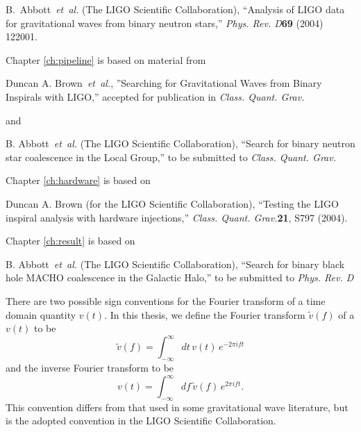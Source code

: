 \documentclass[12pt,notitlepage]{report}
\newcommand{\cqg}{{\it Class. Quant. Grav.}}
\newcommand{\prd}{{\it Phys. Rev. D}}
\begin{document}
\noindent B.~Abbott~{\it et~al.} (The LIGO Scientific Collaboration),
``Analysis of LIGO data for gravitational waves from binary neutron stars,''
\prd {\bf 69} (2004) 122001.
\vspace*{1.5cm}

\noindent Chapter \ref{ch:pipeline} is based on material from
\vspace*{0.5cm}

\noindent Duncan A. Brown~{\it et~al.}, ''Searching for Gravitational Waves
from Binary Inspirals with LIGO,'' accepted for publication in \cqg
\vspace*{0.5cm}

\noindent and
\vspace*{0.5cm}

\noindent B. Abbott~{\it et~al.} (The LIGO Scientific Collaboration), ``Search
for binary neutron star coalescence in the Local Group,'' to be submitted to
\cqg
\vspace*{1.5cm}

\noindent Chapter \ref{ch:hardware} is based on 
\vspace*{0.5cm}

\noindent Duncan A. Brown (for the LIGO Scientific Collaboration), ``Testing
the LIGO inspiral analysis with hardware injections,'' \cqg {\bf 21}, S797
(2004).
\vspace*{1.5cm}

\noindent Chapter \ref{ch:result} is based on
\vspace*{0.5cm}

\noindent B. Abbott~{\it et~al.} (The LIGO Scientific Collaboration), ``Search
for binary black hole MACHO coalescence in the Galactic Halo,'' to be
submitted to \prd


%

There are two possible sign conventions for the Fourier transform of a time
domain quantity $v(t)$. In this thesis, we define the Fourier transform
$\tilde{v}(f)$ of a $v(t)$ to be
\begin{equation}
\label{eq:ft}
\tilde{v}(f)=\int_{-\infty}^\infty dt\,v(t)\, e^{- 2 \pi i f t}
\end{equation}
and the inverse Fourier transform to be 
\begin{equation}
\label{eq:ift}
v(t)=\int_{-\infty}^\infty df\,\tilde{v}(f)\, e^{2 \pi i f t}.
\end{equation}
This convention differs from that used in some gravitational wave literature,
but is the adopted convention in the LIGO Scientific Collaboration.
\end{document}
